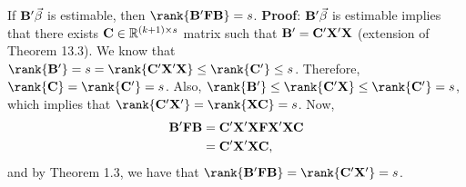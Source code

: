 \begin{Theorem}{}{}
    If $ \mathbf{B}'\vec{\beta} $ is estimable, then
    $ \rank{\Matrix{B}'\Matrix{F}\Matrix{B}}=s $.
    \tcblower{}
    \textbf{Proof}: $ \mathbf{B}'\vec{\beta} $
    is estimable implies that there exists $ \mathbf{C}\in\mathbb{R}^{(k+1)\times s} $
    matrix such that $ \mathbf{B}'=\mathbf{C}'\mathbf{X}'\mathbf{X} $ (extension of Theorem 13.3).
    We know that $ \rank{\Matrix{B}'}=s=\rank{\Matrix{C}'\Matrix{X}'\Matrix{X}}\le \rank{\Matrix{C}'}\le s $.
    Therefore, $ \rank{\Matrix{C}}=\rank{\Matrix{C}'}=s $. Also,
    $ \rank{\Matrix{B}'}\le \rank{\Matrix{C}'\Matrix{X}}\le \rank{\Matrix{C}'}=s $,
    which implies that $ \rank{\Matrix{C}'\Matrix{X}'}=\rank{\Matrix{X}\Matrix{C}}=s $.
    Now,
    \begin{align*}
        \mathbf{B}'\mathbf{F}\mathbf{B}
         & =\mathbf{C}'\mathbf{X}'\mathbf{X}\mathbf{F}\mathbf{X}'\mathbf{X}\mathbf{C} \\
         & =\mathbf{C}'\mathbf{X}'\mathbf{X}\mathbf{C},
    \end{align*}
    and by Theorem 1.3, we have that $ \rank{\Matrix{B}'\Matrix{F}\Matrix{B}}=\rank{\Matrix{C}'\Matrix{X}'}=s $.
\end{Theorem}
